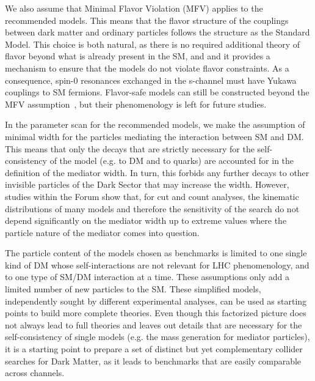 We also assume that Minimal Flavor Violation (MFV) applies to the
recommended models. This means that the flavor structure of the
couplings between dark matter and ordinary particles follows the
structure as the Standard Model. This choice is both natural, as there
is no required additional theory of flavor beyond what is already
present in the SM, and and it provides a mechanism to ensure that the
models do not violate flavor constraints.  As a consequence, spin-0
resonances exchanged in the s-channel must have Yukawa couplings to SM
fermions. Flavor-safe models can still be constructed beyond the MFV
assumption~\cite{Agrawal:2014aoa}, but their phenomenology is left for
future studies.

In the parameter scan for the recommended models, we make the
assumption of minimal width for the particles mediating the
interaction between SM and DM.  This means that only the decays that
are strictly necessary for the self-consistency of the model (e.g.  to
DM and to quarks) are accounted for in the definition of the mediator
width. In turn, this forbids any further decays to other invisible
particles of the Dark Sector that may increase the width. However,
studies within the Forum show that, for cut and count analyses, the
kinematic distributions of many models and therefore the sensitivity
of the search do not depend significantly on the mediator width up to
extreme values where the particle nature of the mediator comes into
question.

The particle content of the models chosen as benchmarks is limited to
one single kind of DM whose self-interactions are not relevant for LHC
phenomenology, and to one type of SM/DM interaction at a time. These
assumptions only add a limited number of new particles to the
SM. These simplified models, independently sought by different
experimental analyses, can be used as starting points to build more
complete theories. Even though this factorized picture does not always
lead to full theories and leaves out details that are necessary for
the self-consistency of single models (e.g. the mass generation for
mediator particles), it is a starting point to prepare a set of
distinct but yet complementary collider searches for Dark Matter, as
it leads to benchmarks that are easily comparable across channels.
